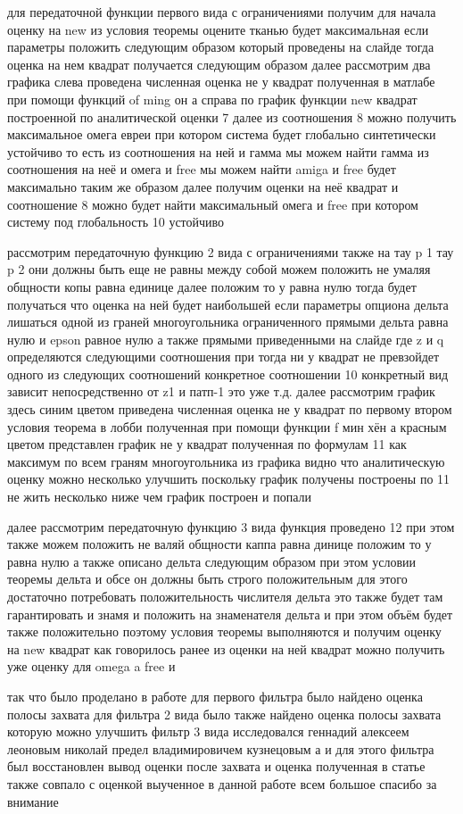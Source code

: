 \documentclass[a4paper,article,14pt]{extarticle}
\begin{document}
для передаточной функции первого вида с ограничениями получим для начала оценку на new из условия теоремы оцените тканью будет максимальная если параметры положить следующим образом который проведены на слайде тогда оценка на нем квадрат получается следующим образом далее рассмотрим два графика слева проведена численная оценка не у квадрат полученная в матлабе при помощи функций of ming он а справа по график функции new квадрат построенной по аналитической оценки 7 далее из соотношения 8 можно получить максимальное омега евреи при котором система будет глобально синтетически устойчиво то есть из соотношения на ней и гамма мы можем найти гамма из соотношения на неё и омега и free мы можем найти amiga и free будет максимально таким же образом далее получим оценки на неё квадрат и соотношение 8 можно будет найти максимальный омега и free при котором систему под глобальность 10 устойчиво 

рассмотрим передаточную функцию 2 вида с ограничениями также на тау p 1 тау p 2 они должны быть еще не равны между собой можем положить не умаляя общности копы равна единице далее положим то у равна нулю тогда будет получаться что оценка на ней будет наибольшей если параметры опциона дельта лишаться одной из граней многоугольника ограниченного прямыми дельта равна нулю и epson равное нулю а также прямыми приведенными на слайде где z и q определяются следующими соотношения при тогда ни у квадрат не превзойдет одного из следующих соотношений конкретное соотношении 10 конкретный вид зависит непосредственно от z1 и патп-1 это уже т.д. далее рассмотрим график здесь синим цветом приведена численная оценка не у квадрат по первому втором условия теорема в лобби полученная при помощи функции f мин хён а красным цветом представлен график не у квадрат полученная по формулам 11 как максимум по всем граням многоугольника из графика видно что аналитическую оценку можно несколько улучшить поскольку график получены построены по 11 не жить несколько ниже чем график построен и попали 

далее рассмотрим передаточную функцию 3 вида функция проведено 12 при этом также можем положить не валяй общности каппа равна  динице положим то у равна нулю а также описано дельта следующим образом при этом условии теоремы дельта и обсе он должны быть строго положительным для этого достаточно потребовать положительность числителя дельта это также будет там гарантировать и знамя и положить на знаменателя дельта и при этом объём будет также положительно поэтому условия теоремы выполняются и получим оценку на new квадрат как говорилось ранее из оценки на ней квадрат можно получить уже оценку для omega a free и 

так что было проделано в работе для первого фильтра было найдено оценка полосы захвата для фильтра 2 вида было также найдено оценка полосы захвата которую можно улучшить фильтр 3 вида исследовался геннадий алексеем леоновым николай предел владимировичем кузнецовым а и для этого фильтра был восстановлен вывод оценки после захвата и оценка полученная в статье также совпало с оценкой выученное в данной работе всем большое спасибо за внимание
\end{document}
